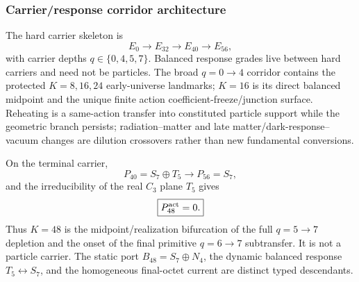 \documentclass[12pt,a4paper]{article}
\begin{document}
\subsubsection{Carrier/response corridor architecture}
The hard carrier skeleton is
\[
 \boxed{E_0\longrightarrow E_{32}\longrightarrow E_{40}\longrightarrow E_{56}},
\]
with carrier depths $q\in\{0,4,5,7\}$.  Balanced response grades live between
hard carriers and need not be particles.  The broad $q=0\to4$ corridor contains
the protected $K=8,16,24$ early-universe landmarks; $K=16$ is its direct
balanced midpoint and the unique finite action coefficient-freeze/junction
surface.  Reheating is a same-action transfer into constituted particle support
while the geometric branch persists; radiation--matter and late
matter/dark-response--vacuum changes are dilution crossovers rather than new
fundamental conversions.

On the terminal carrier,
\[
 P_{40}=S_7\oplus T_5\longrightarrow P_{56}=S_7,
\]
and the irreducibility of the real $C_3$ plane $T_5$ gives
\[
 \boxed{P_{48}^{\rm act}=0.}
\]
Thus $K=48$ is the midpoint/realization bifurcation of the full $q=5\to7$
depletion and the onset of the final primitive $q=6\to7$ subtransfer.  It is
not a particle carrier.  The static port $B_{48}=S_7\oplus N_4$, the dynamic
balanced response $T_5\leftrightarrow S_7$, and the homogeneous final-octet
current are distinct typed descendants.
\end{document}
